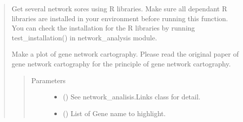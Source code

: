 \documentclass[letterpaper,10pt,english]{sphinxmanual}
\begin{document}
\begin{quote}
\begin{fulllineitems}
\begin{fulllineitems}
\begin{quote}
\begin{description}
\end{description}\end{quote}

\end{fulllineitems}


\begin{fulllineitems}
\label{\detokenize{modules/celloracle.network_analysis:celloracle.network_analysis.Links.get_score}}
Get several network sores using R libraries.
Make sure all dependant R libraries are installed in your environment before running this function.
You can check the installation for the R libraries by running test\_installation() in network\_analysis module.

\end{fulllineitems}


\begin{fulllineitems}
\label{\detokenize{modules/celloracle.network_analysis:celloracle.network_analysis.Links.plot_cartography_scatter_per_cluster}}
Make a plot of gene network cartography.
Please read the original paper of gene network cartography for the principle of gene network cartography.
\begin{quote}\begin{description}
\item[{Parameters}] \leavevmode\begin{itemize}
\item {} 
 ({\hyperref[\detokenize{modules/celloracle:celloracle.Links}]{}}) \textendash{} See network\_analisis.Links class for detail.

\item {} 
 () \textendash{} List of Gene name to highlight.


\end{itemize}
\end{description}
\end{quote}
\end{fulllineitems}
\end{fulllineitems}
\end{quote}
\end{document}
